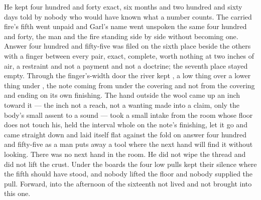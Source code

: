He kept four hundred and forty exact, six months and two hundred and sixty days told by nobody who would have known what a number counts. The carried fire's fifth went unpaid and Garl's name went unspoken the same four hundred and forty, the man and the fire standing side by side without becoming one. Answer four hundred and fifty-five was filed on the sixth place beside the others with a finger between every pair, exact, complete, worth nothing at two inches of air, a restraint and not a payment and not a doctrine; the seventh place stayed empty. Through the finger's-width door the river kept , a low thing over a lower thing under , the note coming from under the covering and not from the covering and ending on its own finishing. The hand outside the wool came up an inch toward it --- the inch not a reach, not a wanting made into a claim, only the body's small assent to a sound --- took a small intake from the room whose floor does not touch his, held the interval whole on the note's finishing, let it go and came straight down and laid itself flat against the fold on answer four hundred and fifty-five as a man puts away a tool where the next hand will find it without looking. There was no next hand in the room. He did not wipe the thread and did not lift the crust. Under the boards the four low pulls kept their silence where the fifth should have stood, and nobody lifted the floor and nobody supplied the pull. Forward, into the afternoon of the sixteenth not lived and not brought into this one.
